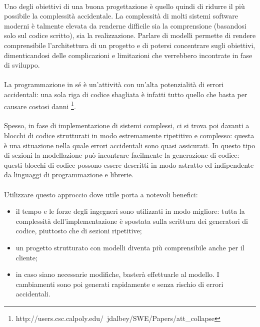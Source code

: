 \documentclass[a4paper, 12pt]{report}
\begin{document}
      \paragraph*{}
      Uno degli obiettivi di una buona progettazione è quello quindi di ridurre il più possibile la complessità accidentale.
      La complessità di molti sistemi software moderni è talmente elevata da renderne difficile sia la comprensione (basandosi solo sul codice scritto), sia la realizzazione.
      Parlare di modelli permette di rendere comprensibile l'architettura di un progetto e di potersi concentrare sugli obiettivi, dimenticandosi delle complicazioni e limitazioni che verrebbero incontrate in fase di sviluppo.
      \paragraph*{}
      La programmazione in sé è un'attività con un'alta potenzialità di errori accidentali: una sola riga di codice sbagliata è infatti tutto quello che basta per causare costosi danni \footnote{http://users.csc.calpoly.edu/~jdalbey/SWE/Papers/att_collapse}.
      \paragraph*{}
      Spesso, in fase di implementazione di sistemi complessi, ci si trova poi davanti a blocchi di codice strutturati in modo estremamente ripetitivo e complesso: questa è una situazione nella quale errori accidentali sono quasi assicurati.
      In questo tipo di sezioni la modellazione può incontrare facilmente la generazione di codice: questi blocchi di codice possono essere descritti in modo astratto ed indipendente da linguaggi di programmazione e librerie.
      \paragraph*{}
      Utilizzare questo approccio dove utile porta a notevoli benefici:
      \begin{itemize}
        \item il tempo e le forze degli ingegneri sono utilizzati in modo migliore: tutta la complessità dell'implementazione è spostata sulla scrittura dei generatori di codice, piuttosto che di sezioni ripetitive;
        \item un progetto strutturato con modelli diventa più comprensibile anche per il cliente;
        \item in caso siano necessarie modifiche, basterà effettuarle al modello. I cambiamenti sono poi generati rapidamente e senza rischio di errori accidentali.
      \end{itemize}
    \newpage
\end{document}
